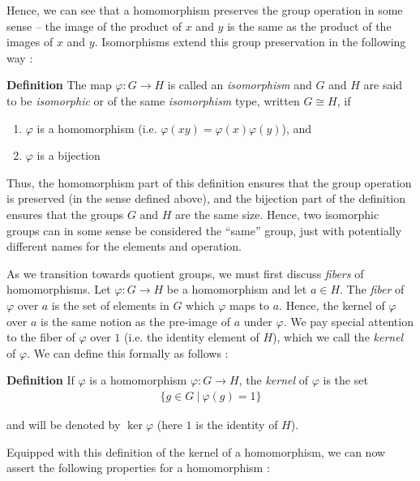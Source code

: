 \documentclass[11pt, reqno]{amsart}
\theoremstyle{plain}
\theoremstyle{definition}
\theoremstyle{example}
\begin{document}
\par
Hence, we can see that a homomorphism preserves the group operation in some sense -- the image of the product of $x$ and $y$ is the same as the product of the images of $x$ and $y$. Isomorphisms extend this group preservation in the following way \cite[\S 1.6, p. 37]{dummit}:

\par
\textbf{Definition} The map $\varphi: G \to H$ is called an \textit{isomorphism} and $G$ and $H$ are said to be \textit{isomorphic} or of the same \textit{isomorphism} type, written $G \cong H$, if
\begin{enumerate}
\item $\varphi$ is a homomorphism (i.e. $\varphi(xy) = \varphi(x)\varphi(y)$), and
\item $\varphi$ is a bijection
\end{enumerate}

\par
Thus, the homomorphism part of this definition ensures that the group operation is preserved (in the sense defined above), and the bijection part of the definition ensures that the groups $G$ and $H$ are the same size. Hence, two isomorphic groups can in some sense be considered the ``same'' group, just with potentially different names for the elements and operation.

\par
As we transition towards quotient groups, we must first discuss \textit{fibers} of homomorphisms. Let $\varphi: G \to H$ be a homomorphism and let $a \in H$. The \textit{fiber} of $\varphi$ over $a$ is the set of elements in $G$ which $\varphi$ maps to $a$. Hence, the kernel of $\varphi$ over $a$ is the same notion as the pre-image of $a$ under $\varphi$. We pay special attention to the fiber of $\varphi$ over $1$ (i.e. the identity element of $H$), which we call the \textit{kernel} of $\varphi$. We can define this formally as follows \cite[\S 3.1, p. 75]{dummit}:

\par
\textbf{Definition} If $\varphi$ is a homomorphism $\varphi: G \to H$, the \textit{kernel} of $\varphi$ is the set
\begin{align*}
\{g \in G \ | \ \varphi(g) = 1\}
\end{align*}

and will be denoted by $\ker \varphi$ (here $1$ is the identity of $H$).

\par
Equipped with this definition of the kernel of a homomorphism, we can now assert the following properties for a homomorphism \cite[\S 3.1, 75]{dummit}:
\end{document}
